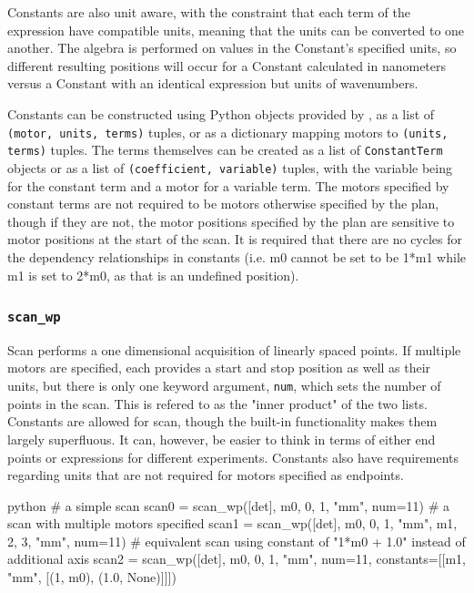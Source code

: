 Constants are also unit aware, with the constraint that each term of the expression have compatible units, meaning that the units can be converted to one another.
The algebra is performed on values in the Constant's specified units, so different resulting positions will occur for a Constant calculated in nanometers versus a Constant with an identical expression but units of wavenumbers.

Constants can be constructed using Python objects provided by \wrightplans, as a list of \texttt{(motor, units, terms)} tuples, or as a dictionary mapping motors to \texttt{(units, terms)} tuples.
The terms themselves can be created as a list of \texttt{ConstantTerm} objects or as a list of \texttt{(coefficient, variable)} tuples, with the variable being  for the constant term and a motor for a variable term.
The motors specified by constant terms are not required to be motors otherwise specified by the plan, though if they are not, the motor positions specified by the plan are sensitive to motor positions at the start of the scan.
It is required that there are no cycles for the dependency relationships in constants (i.e. m0 cannot be set to be 1*m1 while m1 is set to 2*m0, as that is an undefined position).

\subsubsection{\texttt{scan\_wp}}

Scan performs a one dimensional acquisition of linearly spaced points.
If multiple motors are specified, each provides a start and stop position as well as their units, but there is only one keyword argument, \texttt{num}, which sets the number of points in the scan.
This is refered to as the "inner product" of the two lists.
Constants are allowed for scan, though the built-in functionality makes them largely superfluous.
It can, however, be easier to think in terms of either end points or expressions for different experiments.
Constants also have requirements regarding units that are not required for motors specified as endpoints.

\begin{codefragment}{python}
# a simple scan
scan0 = scan_wp([det], m0, 0, 1, "mm", num=11)
# a scan with multiple motors specified
scan1 = scan_wp([det], m0, 0, 1, "mm", m1, 2, 3, "mm", num=11)
# equivalent scan using constant of "1*m0 + 1.0" instead of additional axis
scan2 = scan_wp([det], m0, 0, 1, "mm", num=11, constants=[[m1, "mm", [(1, m0), (1.0, None)]]])
\end{codefragment}

